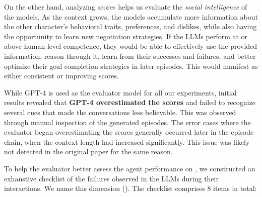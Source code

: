 On the other hand, analyzing \goalcompletion scores helps us evaluate the \textit{social intelligence} of the models. As the context grows, the models accumulate more information about the other character's behavioral traits, preferences, and dislikes, while also having the opportunity to learn new negotiation strategies. If the LLMs perform at or above human-level competence, they would be able to effectively use the provided information, reason through it, learn from their successes and failures, and better optimize their goal completion strategies in later episodes. This would manifest as either consistent or improving \goalcompletion scores.

While GPT-4 is used as the evaluator model for all our experiments, initial results revealed that \textbf{GPT-4 overestimated the \believability scores} and failed to recognize several cues that made the conversations less believable. This was observed through manual inspection of the generated episodes. The error cases where the evaluator began overestimating the \believability scores generally occurred later in the episode chain, when the context length had increased significantly. This issue was likely not detected in the original \sotopia paper for the same reason.

To help the evaluator better assess the agent performance on \believability, we constructed an exhaustive checklist of the failures observed in the LLMs during their interactions. We name this dimension \believabilityextendedFull (\believabilityextended). The checklist comprises 8 items in total:

